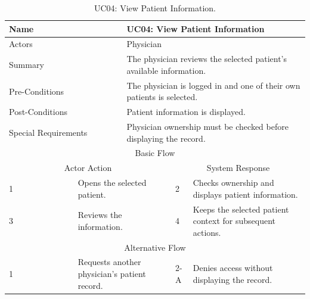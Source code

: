 \begin{table}[htbp]
\centering
\small
\caption{UC04: View Patient Information.}
\label{tab:kashaf:uc04}
\begin{tabular}{|p{}|p{}|p{}|p{}|p{}|}
\hline
\multicolumn{2}{|p{\dimexpr0.225\textwidth+2\tabcolsep+\arrayrulewidth\relax}|}{Name} & \multicolumn{3}{p{\dimexpr0.575\textwidth+4\tabcolsep+2\arrayrulewidth\relax}|}{UC04: View Patient Information} \\ \hline
\multicolumn{2}{|p{\dimexpr0.225\textwidth+2\tabcolsep+\arrayrulewidth\relax}|}{Actors} & \multicolumn{3}{p{\dimexpr0.575\textwidth+4\tabcolsep+2\arrayrulewidth\relax}|}{Physician} \\ \hline
\multicolumn{2}{|p{\dimexpr0.225\textwidth+2\tabcolsep+\arrayrulewidth\relax}|}{Summary} & \multicolumn{3}{p{\dimexpr0.575\textwidth+4\tabcolsep+2\arrayrulewidth\relax}|}{The physician reviews the selected patient's available information.} \\ \hline
\multicolumn{2}{|p{\dimexpr0.225\textwidth+2\tabcolsep+\arrayrulewidth\relax}|}{Pre-Conditions} & \multicolumn{3}{p{\dimexpr0.575\textwidth+4\tabcolsep+2\arrayrulewidth\relax}|}{The physician is logged in and one of their own patients is selected.} \\ \hline
\multicolumn{2}{|p{\dimexpr0.225\textwidth+2\tabcolsep+\arrayrulewidth\relax}|}{Post-Conditions} & \multicolumn{3}{p{\dimexpr0.575\textwidth+4\tabcolsep+2\arrayrulewidth\relax}|}{Patient information is displayed.} \\ \hline
\multicolumn{2}{|p{\dimexpr0.225\textwidth+2\tabcolsep+\arrayrulewidth\relax}|}{Special Requirements} & \multicolumn{3}{p{\dimexpr0.575\textwidth+4\tabcolsep+2\arrayrulewidth\relax}|}{Physician ownership must be checked before displaying the record.} \\ \hline
\multicolumn{5}{|c|}{Basic Flow} \\ \hline
\multicolumn{3}{|c|}{Actor Action} & \multicolumn{2}{c|}{System Response} \\ \hline
1 & \multicolumn{2}{p{\dimexpr0.37\textwidth+2\tabcolsep+\arrayrulewidth\relax}|}{Opens the selected patient.} & 2 & Checks ownership and displays patient information. \\ \hline
3 & \multicolumn{2}{p{\dimexpr0.37\textwidth+2\tabcolsep+\arrayrulewidth\relax}|}{Reviews the information.} & 4 & Keeps the selected patient context for subsequent actions. \\ \hline
\multicolumn{5}{|c|}{Alternative Flow} \\ \hline
1 & \multicolumn{2}{p{\dimexpr0.37\textwidth+2\tabcolsep+\arrayrulewidth\relax}|}{Requests another physician's patient record.} & 2-A & Denies access without displaying the record. \\ \hline
\end{tabular}
\end{table}

